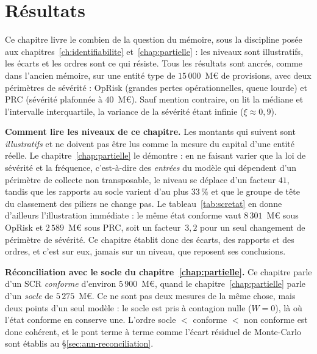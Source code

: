 \chapter{Résultats}
\label{chap:resultats}

Ce chapitre livre le \og combien \fg{} de la question du mémoire, sous la discipline posée
aux chapitres~\ref{ch:identifiabilite} et~\ref{chap:partielle} : les niveaux sont
illustratifs, les écarts et les ordres sont ce qui résiste. Tous les résultats sont ancrés,
comme dans l'ancien mémoire, sur une entité type de $15\,000$~M\euro{} de provisions, avec
deux périmètres de sévérité : OpRisk (grandes pertes opérationnelles, queue lourde)
et PRC (sévérité plafonnée à $40$~M\euro). Sauf mention contraire, on lit la médiane
et l'intervalle interquartile, la variance de la sévérité étant infinie ($\xi\approx0{,}9$).

\begin{attention}
\textbf{Comment lire les niveaux de ce chapitre.} Les montants qui suivent sont
\emph{illustratifs} et ne doivent pas être lus comme la mesure du capital d'une entité réelle.
Le chapitre~\ref{chap:partielle} le démontre : en ne faisant varier que la loi de sévérité et la
fréquence, c'est-à-dire des \emph{entrées} du modèle qui dépendent d'un périmètre de collecte
non transposable, le niveau se déplace d'un facteur $41$, tandis que les rapports au socle
varient d'au plus $33\,\%$ et que le groupe de tête du classement des piliers ne change pas. Le
tableau~\ref{tab:scretat} en donne d'ailleurs l'illustration immédiate : le même état conforme
vaut $8\,301$~M\euro{} sous OpRisk et $2\,589$~M\euro{} sous PRC, soit un facteur~$3{,}2$ pour
un seul changement de périmètre de sévérité. Ce chapitre établit donc des écarts, des
rapports et des ordres, et c'est sur eux, jamais sur un niveau, que reposent ses conclusions.
\end{attention}

\begin{cle}
\textbf{Réconciliation avec le socle du chapitre~\ref{chap:partielle}.} Ce chapitre parle d'un
SCR \emph{conforme} d'environ $5\,900$~M\euro{}, quand le chapitre~\ref{chap:partielle} parle
d'un \emph{socle} de $5\,275$~M\euro{}. Ce ne sont pas deux mesures de la même chose, mais deux
points d'un seul modèle : le socle est pris à contagion nulle ($W=0$), là où l'état
conforme en conserve une. L'ordre socle $<$ conforme $<$ non conforme est donc cohérent, et le
pont terme à terme comme l'écart résiduel de Monte-Carlo sont établis au
\S\ref{sec:ann-reconciliation}.
\end{cle}

